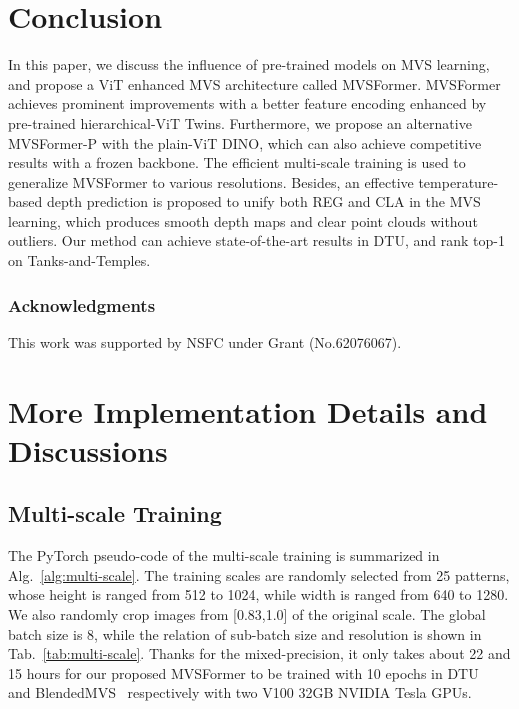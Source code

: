 \documentclass[10pt]{article} \usepackage[preprint]{tmlr}
\begin{document}
\section{Conclusion}
In this paper, we discuss the influence of pre-trained models on MVS learning, and propose a ViT enhanced MVS architecture called MVSFormer. MVSFormer achieves prominent improvements with a better feature encoding enhanced by pre-trained hierarchical-ViT Twins.
Furthermore, we propose an alternative MVSFormer-P with the plain-ViT DINO, which can also achieve competitive results with a frozen backbone.
The efficient multi-scale training is used to generalize MVSFormer to various resolutions. Besides, an effective temperature-based depth prediction is proposed to unify both REG and CLA in the MVS learning, which produces smooth depth maps and clear point clouds without outliers. Our method can achieve state-of-the-art results in DTU, and rank top-1 on Tanks-and-Temples.





\subsubsection*{Acknowledgments}
This work was supported by NSFC under Grant (No.62076067).




\appendix


\section{More Implementation Details and Discussions}
\label{sec:appendix_impl}

\subsection{Multi-scale Training} 
\label{sec:appendix_multiscale_impl}
The PyTorch pseudo-code of the multi-scale training is summarized in Alg.~\ref{alg:multi-scale}.
The training scales are randomly selected from 25 patterns, whose height is ranged from 512 to 1024, while width is ranged from 640 to 1280. We also randomly crop images from [0.83,1.0] of the original scale. The global batch size is 8, while the relation of sub-batch size and resolution is shown in Tab.~\ref{tab:multi-scale}. Thanks for the mixed-precision, it only takes about 22 and 15 hours for our proposed MVSFormer to be trained with 10 epochs in DTU~\citep{aanaes2016large} and BlendedMVS~\citep{yao2020blendedmvs} respectively with two V100 32GB NVIDIA Tesla GPUs. 
\end{document}
